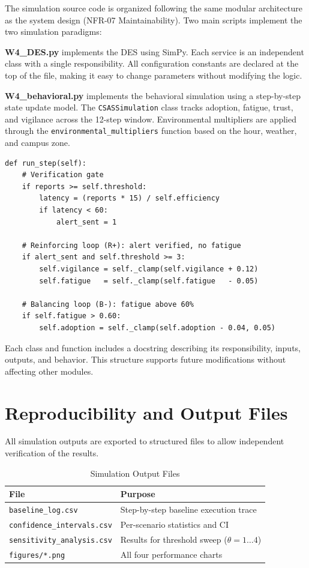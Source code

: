 \documentclass[conference,a4paper,10pt]{IEEEtran}
\begin{document}
The simulation source code is organized following the same modular
architecture as the system design (NFR-07 Maintainability). Two
main scripts implement the two simulation paradigms:

\textbf{W4\_DES.py} implements the DES using SimPy. Each service
is an independent class with a single responsibility. All
configuration constants are declared at the top of the file,
making it easy to change parameters without modifying the logic.

\textbf{W4\_behavioral.py} implements the behavioral simulation using
a step-by-step state update model. The \texttt{CSASSimulation} class
tracks adoption, fatigue, trust, and vigilance across the 12-step
window. Environmental multipliers are applied through the
\texttt{environmental\_multipliers} function based on the hour,
weather, and campus zone.

\begin{lstlisting}[caption={Verification gate and feedback loops
--- W4\_behavioral.py}]
def run_step(self):
    # Verification gate
    if reports >= self.threshold:
        latency = (reports * 15) / self.efficiency
        if latency < 60:
            alert_sent = 1

    # Reinforcing loop (R+): alert verified, no fatigue
    if alert_sent and self.threshold >= 3:
        self.vigilance = self._clamp(self.vigilance + 0.12)
        self.fatigue   = self._clamp(self.fatigue   - 0.05)

    # Balancing loop (B-): fatigue above 60%
    if self.fatigue > 0.60:
        self.adoption = self._clamp(self.adoption - 0.04, 0.05)
\end{lstlisting}

Each class and function includes a docstring describing its
responsibility, inputs, outputs, and behavior. This structure
supports future modifications without affecting other modules.

\section{Reproducibility and Output Files}

All simulation outputs are exported to structured files to allow
independent verification of the results.

\begin{table}[H]
\caption{Simulation Output Files}
\label{tab:outputs}\centering\small
\begin{tabular}{ll}
\toprule
\textbf{File} & \textbf{Purpose}\\
\midrule
\texttt{baseline\_log.csv}         & Step-by-step baseline execution trace\\
\texttt{confidence\_intervals.csv} & Per-scenario statistics and CI\\
\texttt{sensitivity\_analysis.csv} & Results for threshold sweep ($\theta=1\ldots4$)\\
\texttt{figures/*.png}             & All four performance charts\\
\bottomrule
\end{tabular}
\end{table}
\end{document}
